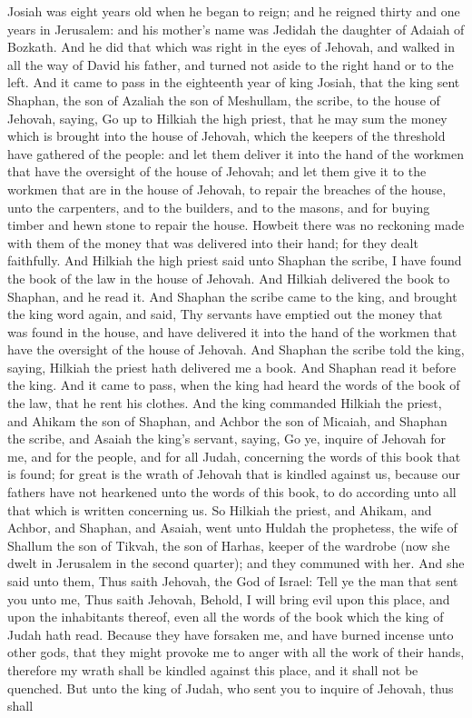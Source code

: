 Josiah was eight years old when he began to reign; and he reigned thirty and one years in Jerusalem: and his mother’s name was Jedidah the daughter of Adaiah of Bozkath. And he did that which was right in the eyes of Jehovah, and walked in all the way of David his father, and turned not aside to the right hand or to the left.  And it came to pass in the eighteenth year of king Josiah, that the king sent Shaphan, the son of Azaliah the son of Meshullam, the scribe, to the house of Jehovah, saying, Go up to Hilkiah the high priest, that he may sum the money which is brought into the house of Jehovah, which the keepers of the threshold have gathered of the people: and let them deliver it into the hand of the workmen that have the oversight of the house of Jehovah; and let them give it to the workmen that are in the house of Jehovah, to repair the breaches of the house, unto the carpenters, and to the builders, and to the masons, and for buying timber and hewn stone to repair the house. Howbeit there was no reckoning made with them of the money that was delivered into their hand; for they dealt faithfully.  And Hilkiah the high priest said unto Shaphan the scribe, I have found the book of the law in the house of Jehovah. And Hilkiah delivered the book to Shaphan, and he read it. And Shaphan the scribe came to the king, and brought the king word again, and said, Thy servants have emptied out the money that was found in the house, and have delivered it into the hand of the workmen that have the oversight of the house of Jehovah. And Shaphan the scribe told the king, saying, Hilkiah the priest hath delivered me a book. And Shaphan read it before the king. And it came to pass, when the king had heard the words of the book of the law, that he rent his clothes. And the king commanded Hilkiah the priest, and Ahikam the son of Shaphan, and Achbor the son of Micaiah, and Shaphan the scribe, and Asaiah the king’s servant, saying, Go ye, inquire of Jehovah for me, and for the people, and for all Judah, concerning the words of this book that is found; for great is the wrath of Jehovah that is kindled against us, because our fathers have not hearkened unto the words of this book, to do according unto all that which is written concerning us.  So Hilkiah the priest, and Ahikam, and Achbor, and Shaphan, and Asaiah, went unto Huldah the prophetess, the wife of Shallum the son of Tikvah, the son of Harhas, keeper of the wardrobe (now she dwelt in Jerusalem in the second quarter); and they communed with her. And she said unto them, Thus saith Jehovah, the God of Israel: Tell ye the man that sent you unto me, Thus saith Jehovah, Behold, I will bring evil upon this place, and upon the inhabitants thereof, even all the words of the book which the king of Judah hath read. Because they have forsaken me, and have burned incense unto other gods, that they might provoke me to anger with all the work of their hands, therefore my wrath shall be kindled against this place, and it shall not be quenched. But unto the king of Judah, who sent you to inquire of Jehovah, thus shall 
